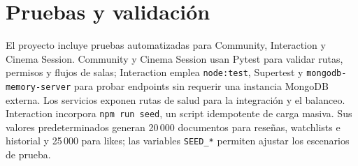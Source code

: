\chapter{Pruebas y validación}
El proyecto incluye pruebas automatizadas para Community, Interaction y Cinema Session. Community y Cinema Session usan Pytest para validar rutas, permisos y flujos de salas; Interaction emplea \texttt{node:test}, Supertest y \texttt{mongodb-memory-server} para probar endpoints sin requerir una instancia MongoDB externa. Los servicios exponen rutas de salud para la integración y el balanceo.
Interaction incorpora \texttt{npm run seed}, un script idempotente de carga masiva. Sus valores predeterminados generan 20\,000 documentos para reseñas, watchlists e historial y 25\,000 para likes; las variables \texttt{SEED\_*} permiten ajustar los escenarios de prueba.

